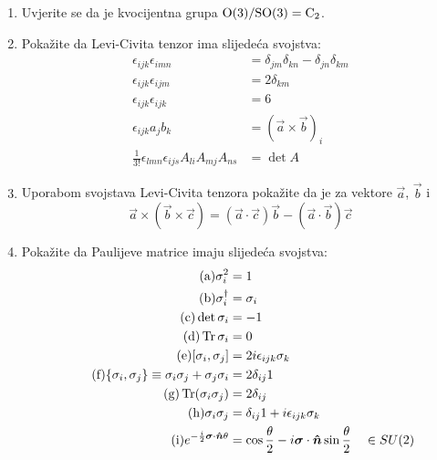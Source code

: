 \begin{enumerate}[label=\arabic{chapter}.\arabic*.]

\item \label{zad:O3oSO3} Uvjerite se da je kvocijentna grupa $\mathrm{O}(3)/\mathrm{SO}(3) = \mathrm{C}_{2}$.

\item \label{zad:LeviCivitaProperties} Pokažite da Levi-Civita tenzor ima slijedeća svojstva:
\begin{align*}
\tag{a}\epsilon_{ijk}\epsilon_{imn}&=\delta_{jm}\delta_{kn}-\delta_{jn}\delta_{km}\\
\tag{b}\epsilon_{ijk}\epsilon_{ijm}&=2\delta_{km} \\
\tag{c}\epsilon_{ijk}\epsilon_{ijk}&=6 \\
\tag{d}\epsilon_{ijk}a_j b_k &= (\vec{a}\times\vec{b})_i  \\
\tag{e}\frac{1}{3!}\epsilon_{lmn} \epsilon_{ijs} A_{li} A_{mj} A_{ns} &= \det A
\end{align*}

\item Uporabom svojstava Levi-Civita tenzora pokažite da je
za vektore $\vec{a}$, $\vec{b}$ i 
\begin{displaymath}
    \vec{a}\times(\vec{b}\times\vec{c})=(\vec{a}\cdot\vec{c})\vec{b}
 -(\vec{a}\cdot\vec{b})\vec{c}
\end{displaymath}

\item Pokažite da Paulijeve matrice imaju slijedeća svojstva:
\begin{align*}
\tag{a} \sigma_{i}^2 &= 1 \\
\tag{b} \sigma_{i}^\dagger &= \sigma_i \\
\tag{c} \det \sigma_i &= -1 \\
\tag{d} \Tr \sigma_i &=0 \\
\tag{e} [\sigma_i, \sigma_j] &= 2 i \epsilon_{ijk} \sigma_k \\
\tag{f} \{\sigma_i, \sigma_j\}\equiv \sigma_i\sigma_j + \sigma_j \sigma_i &= 2
\delta_{ij} 1 \\
\tag{g} \Tr (\sigma_i \sigma_j) &= 2\delta_{ij} \\
\tag{h} \sigma_i \sigma_j &= \delta_{ij} 1 + i \epsilon_{ijk}\sigma_k\\
\tag{i} e^{-\frac{i}{2}\vec{\sigma}\cdot\unitn \theta} &=
\cos \frac{\theta}{2}-i\vec{\sigma}\cdot\unitn \sin\frac{\theta}{2} \quad\in SU(2)
\end{align*}


\end{enumerate}
